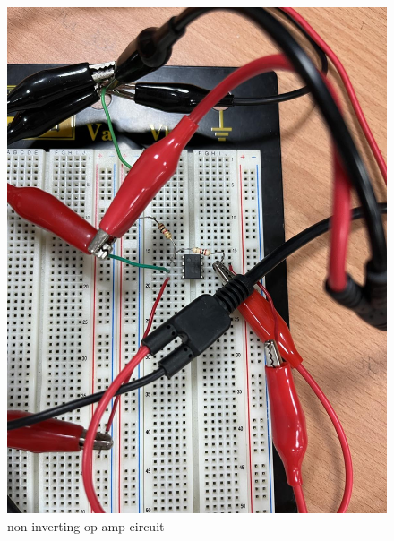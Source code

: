 \documentclass{article}
\begin{document}
\begin{CJK*}{UTF8}{bkai}
\begin{minipage}{0.50\textwidth}
\begin{figure}[H]
\begin{center}
            \includegraphics[scale=0.10]{noninv_op_amp_circuit.jpg}
            \caption{non-inverting op-amp circuit}
        \end{center}
    \end{figure}    
\end{minipage}


\begin{center}
\begin{figure}[h]
    

\end{figure}
\end{center}
\end{CJK*}
\end{document}
